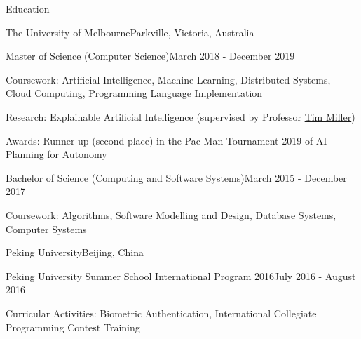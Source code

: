 \documentclass{cv}
\begin{document}
\address{
\textbf{Phone} \texttt{<REDACTED>} $\cdot$\space
\textbf{Email} \href{mailto:luo@jiahai.co}{luo@jiahai.co} $\cdot$\space
\textbf{LinkedIn} \href{https://linkedin.com/in/luojiahai/}{in/luojiahai} $\cdot$\space
\textbf{GitHub} \href{https://github.com/luojiahai/}{luojiahai}
}

\begin{cvsection}{Education}

\begin{cvheading}{The University of Melbourne}{Parkville, Victoria, Australia}
\begin{cvsubheading}{Master of Science (Computer Science)}{March 2018 - December 2019}
\item Coursework: Artificial Intelligence, Machine Learning, Distributed Systems, Cloud Computing, Programming Language Implementation
\item Research: Explainable Artificial Intelligence (supervised by Professor \href{https://eecs.uq.edu.au/profile/9477/tim-miller}{Tim Miller})
\item Awards: Runner-up (second place) in the Pac-Man Tournament 2019 of AI Planning for Autonomy
\end{cvsubheading}
\begin{cvsubheading}{Bachelor of Science (Computing and Software Systems)}{March 2015 - December 2017}
\item Coursework: Algorithms, Software Modelling and Design, Database Systems, Computer Systems
\end{cvsubheading}
\end{cvheading}

\begin{cvheading}{Peking University}{Beijing, China}
\begin{cvsubheading}{Peking University Summer School International Program 2016}{July 2016 - August 2016}
\item Curricular Activities: Biometric Authentication, International Collegiate Programming Contest Training
\end{cvsubheading}
\end{cvheading}

\end{cvsection}
\end{document}
